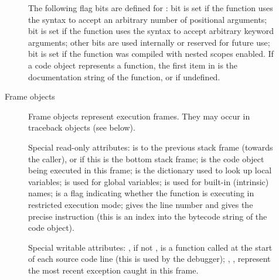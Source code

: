 \begin{description}
\begin{description}

The following flag bits are defined for : bit
 is set if the function uses the  syntax
to accept an arbitrary number of positional arguments; bit
 is set if the function uses the  syntax
to accept arbitrary keyword arguments; other bits are used internally
or reserved for future use; bit  is set if the function was
compiled with nested scopes enabled.  If a
code object represents a function, the first item in
 is the documentation string of the function, or
 if undefined.

\item[Frame objects]
Frame objects represent execution frames.  They may occur in traceback
objects (see below).

Special read-only attributes:  is to the previous
stack frame (towards the caller), or  if this is the bottom
stack frame;  is the code object being executed in this
frame;  is the dictionary used to look up local
variables;  is used for global variables;
 is used for built-in (intrinsic) names;
 is a flag indicating whether the function is
executing in restricted execution mode;
 gives the line number and  gives the
precise instruction (this is an index into the bytecode string of
the code object).

Special writable attributes: , if not , is a
function called at the start of each source code line (this is used by
the debugger); , ,
 represent the most recent exception caught in
this frame.


\end{description}
\end{description}
